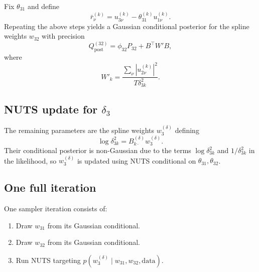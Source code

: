 Fix $\theta_{31}$ and define
\[
\bar r^{(k)}_{\nu}
=
u^{(k)}_{3\nu}
-
\theta_{31}^{(k)} u^{(k)}_{1\nu}.
\]
Repeating the above steps yields a Gaussian conditional posterior for the spline weights
$w_{32}$ with precision
\[
Q^{(32)}_{\text{post}} = \phi_{32} P_{32} + B^\top W' B,
\]
where
\[
W'_k = \frac{\sum_\nu |u^{(k)}_{2\nu}|^2}{T\delta_{3k}^2}.
\]

\subsection{NUTS update for $\delta_3$}

The remaining parameters are the spline weights $w^{(\delta)}_3$ defining
\[
\log \delta_{3k}^2 = B^{(\delta)}_{k\cdot} w^{(\delta)}_3.
\]
Their conditional posterior is non-Gaussian due to the terms
$\log \delta_{3k}^2$ and $1/\delta_{3k}^2$ in the likelihood, so $w^{(\delta)}_3$
is updated using NUTS conditional on $\theta_{31},\theta_{32}$.

\subsection{One full iteration}

One sampler iteration consists of:
\begin{enumerate}
\item Draw $w_{31}$ from its Gaussian conditional.
\item Draw $w_{32}$ from its Gaussian conditional.
\item Run NUTS targeting $p(w^{(\delta)}_3 \mid w_{31}, w_{32}, \text{data})$.
\end{enumerate}
